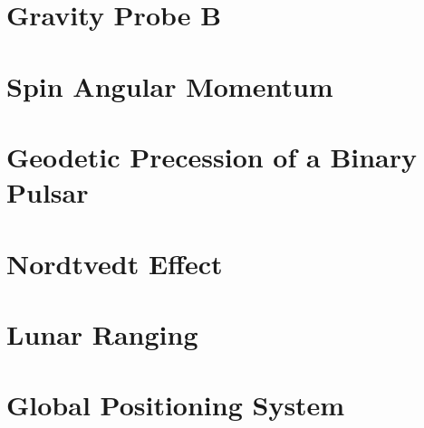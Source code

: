\section{Gravity Probe B}
\section{Spin Angular Momentum}
\section{Geodetic Precession of a Binary Pulsar}
\section{Nordtvedt Effect}
\section{Lunar Ranging}

\section{Global Positioning System}
